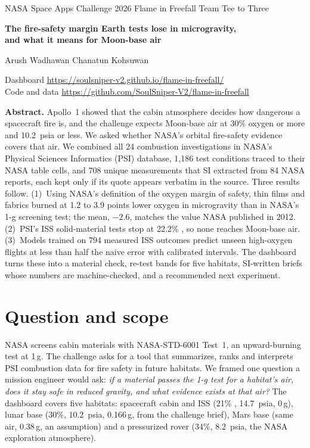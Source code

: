 \documentclass[10pt,letterpaper]{article}
\newcommand{\Otwo}{\ce{O2}}
\begin{document}
{\small\color{ink!70}NASA Space Apps Challenge 2026 \textperiodcentered{} Flame in Freefall \textperiodcentered{} Team Tee to Three}\par\vspace{0.4em}
{\LARGE\bfseries The fire-safety margin Earth tests lose in microgravity,\\ and what it means for Moon-base air\par}
\vspace{0.6em}
{\normalsize Arush Wadhawan \quad Chanatun Kohsuwan}\par
{\small Dashboard \url{https://soulsniper-v2.github.io/flame-in-freefall/}\\ Code and data \url{https://github.com/SoulSniper-V2/flame-in-freefall}\par}
\vspace{0.8em}

\noindent\colorbox{ink!5}{\parbox{\dimexpr\linewidth-2\fboxsep}{\small
\textbf{Abstract.} Apollo~1 showed that the cabin atmosphere decides how dangerous a spacecraft fire is, and the challenge expects Moon-base air at 30\% oxygen or more and 10.2~psia or less. We asked whether NASA's orbital fire-safety evidence covers that air. We combined all 24 combustion investigations in NASA's Physical Sciences Informatics (PSI) database, 1{,}186 test conditions traced to their NASA table cells, and 708 unique measurements that SI extracted from 84 NASA reports, each kept only if its quote appears verbatim in the source. Three results follow. (1)~Using NASA's definition of the oxygen margin of safety, thin films and fabrics burned at 1.2 to 3.9 points lower oxygen in microgravity than in NASA's 1-g screening test; the mean, $-2.6$, matches the value NASA published in 2012. (2)~PSI's ISS solid-material tests stop at 22.2\% \Otwo, so none reaches Moon-base air. (3)~Models trained on 794 measured ISS outcomes predict unseen high-oxygen flights at less than half the naive error with calibrated intervals. The dashboard turns these into a material check, re-test bands for five habitats, SI-written briefs whose numbers are machine-checked, and a recommended next experiment.}}

\section{Question and scope}
NASA screens cabin materials with NASA-STD-6001 Test~1, an upward-burning test at 1\,g. The challenge asks for a tool that summarizes, ranks and interprets PSI combustion data for fire safety in future habitats. We framed one question a mission engineer would ask: \emph{if a material passes the 1-g test for a habitat's air, does it stay safe in reduced gravity, and what evidence exists at that air?} The dashboard covers five habitats: spacecraft cabin and ISS (21\% \Otwo, 14.7~psia, 0\,g), lunar base (30\%, 10.2~psia, 0.166\,g, from the challenge brief), Mars base (same air, 0.38\,g, an assumption) and a pressurized rover (34\%, 8.2~psia, the NASA exploration atmosphere).
\end{document}
